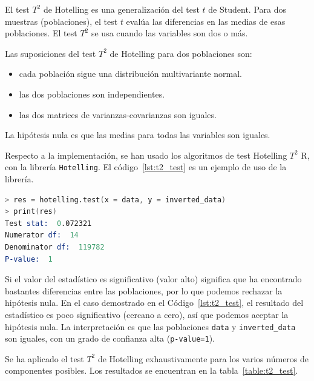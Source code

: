 \documentclass[11pt,spanish,listoffigures,listoftables]{tfgetsinf}
\begin{document}
    El test \(T^2\) de Hotelling es una generalización del test \(t\) de Student. Para dos muestras (poblaciones), el test \(t\) evalúa las diferencias en las medias de esas poblaciones. El test \(T^2\) se usa cuando las variables son dos o más.

    Las suposiciones del test \(T^2\) de Hotelling para dos poblaciones son:
    \begin{itemize}
    \item cada población sigue una distribución multivariante normal.
    \item las dos poblaciones son independientes.
    \item las dos matrices de varianzas-covarianzas son iguales.
    \end{itemize}
    
    La hipótesis nula es que las medias para todas las variables son iguales. 
    
    Respecto a la implementación, se han usado los algoritmos de test Hotelling \(T^2\) R, con la librería {\tt Hotelling}. El código~\ref{lst:t2_test} es un ejemplo de uso de la librería.

    \begin{lstlisting}[language=S, caption=Test \(T^2\) de Hotelling en R., label={lst:t2_test}]
> res = hotelling.test(x = data, y = inverted_data)
> print(res)
Test stat:  0.072321 
Numerator df:  14 
Denominator df:  119782 
P-value:  1
    \end{lstlisting}
    
    Si el valor del estadístico es significativo (valor alto) significa que ha encontrado bastantes diferencias entre las poblaciones, por lo que podemos rechazar la hipótesis nula. En el caso demostrado en el Código~\ref{lst:t2_test}, el resultado del estadístico es poco significativo (cercano a cero), así que podemos aceptar la hipótesis nula. La interpretación es que las poblaciones {\tt data} y {\tt inverted\_data} son iguales, con un grado de confianza alta ({\tt p-value=1}). 
    
    Se ha aplicado el test \(T^2\) de Hotelling exhaustivamente para los varios números de componentes posibles. Los resultados se encuentran en la tabla~\ref{table:t2_test}.
    
\end{document}
